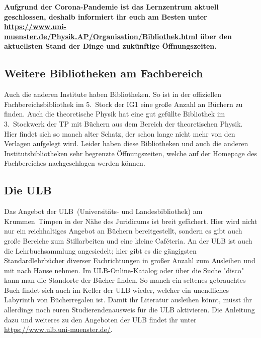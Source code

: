 \begin{multicols}{2}
\textbf{Aufgrund der Corona-Pandemie ist das Lernzentrum aktuell geschlossen, deshalb informiert ihr euch am Besten unter \url{https://www.uni-muenster.de/Physik.AP/Organisation/Bibliothek.html} über den aktuellsten Stand der Dinge und zukünftige Öffnungszeiten.}

\begin{center}
\end{center}

\subsection{Weitere Bibliotheken am Fachbereich}
Auch die anderen Institute haben Bibliotheken.
So ist in der offiziellen Fachbereichsbibliothek im 5.~Stock der IG1 eine große Anzahl an Büchern zu finden.
Auch die theoretische Physik hat eine gut gefüllte Bibliothek im 3.~Stockwerk der TP mit Büchern aus dem Bereich der theoretischen Physik.
Hier findet sich so manch alter Schatz, der schon lange nicht mehr von den Verlagen aufgelegt wird.
Leider haben diese Bibliotheken und auch die anderen Institutsbibliotheken sehr begrenzte Öffnungszeiten, welche auf der Homepage des Fachbereiches nachgeschlagen werden können.


\subsection{Die ULB}
Das Angebot der ULB~(Universitäts- und Landesbibliothek) am Krummen~Timpen in der Nähe des Juridicums ist breit gefächert.
Hier wird nicht nur ein reichhaltiges Angebot an Büchern bereitgestellt, sondern es gibt auch große Bereiche zum Stillarbeiten und eine kleine Caféteria.
An der ULB ist auch die Lehrbuchsammlung angesiedelt; hier gibt es die gängigsten Standardlehrbücher diverser Fachrichtungen in großer Anzahl zum Ausleihen und mit nach Hause nehmen.
Im ULB-Online-Katalog oder über die Suche "disco" kann man die Standorte der Bücher finden.
So manch ein seltenes gebrauchtes Buch findet sich auch im Keller der ULB wieder, welcher ein unendliches Labyrinth von Bücherregalen ist.
Damit ihr Literatur ausleihen könnt, müsst ihr allerdings noch euren Studierendenausweis für die ULB aktivieren. Die Anleitung dazu und weiteres zu den Angeboten der ULB findet ihr unter \url{https://www.ulb.uni-muenster.de/}.



\end{multicols}
